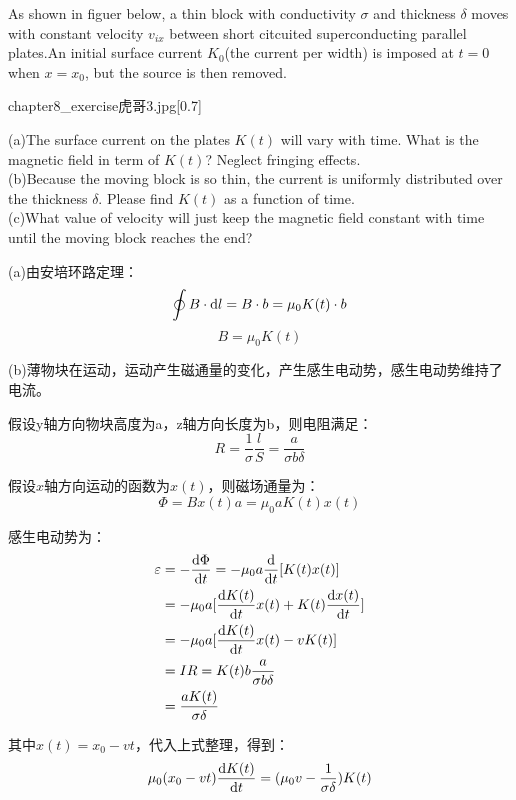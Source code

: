 \begin{solution}
    As shown in figuer below, a thin block with conductivity \(\sigma\) and thickness \( \delta \) moves with constant velocity $v_{ix}$
    between short citcuited superconducting parallel plates.An initial surface current \( K_0 \)(the current per width) is imposed
    at \( t = 0 \) when \( x = x_0 \), but the source is then removed.
    \begin{singlefigure}{chapter8_exercise虎哥3.jpg}[0.7]
    \end{singlefigure}

    (a)The surface current on the plates \( K(t) \) will vary with time. What is the magnetic field in term of \( K(t) \)? Neglect 
    fringing effects.\\
    (b)Because the moving block is so thin, the current is uniformly distributed over the thickness \( \delta \).
    Please find \( K(t) \) as a function of time.\\
    (c)What value of velocity will just keep the magnetic field constant with time until the moving block reaches the end?
    \tcbrule

    (a)由安培环路定理：
    \[\oint B\cdot\dif l = B\cdot b = \mu_0 K(t)\cdot b\]
    \[B = \mu_0 K(t)\]

    (b)薄物块在运动，运动产生磁通量的变化，产生感生电动势，感生电动势维持了电流。

    假设y轴方向物块高度为a，z轴方向长度为b，则电阻满足：
    \[R = \dfrac{1}{\sigma}\dfrac{l}{S} = \dfrac{a}{\sigma b\delta}\]

    假设$x$轴方向运动的函数为$x(t)$，则磁场通量为：
    \[\Phi = Bx(t)a = \mu_0 a K(t)x(t)\]

    感生电动势为：
    \begin{align*}
        \varepsilon &= -\dfrac{\dif \Phi}{\dif t} = -\mu_0 a \dfrac{\dif}{\dif t}[K(t)x(t)]\\
                    &= -\mu_0 a [\dfrac{\dif K(t)}{\dif t}x(t) + K(t)\dfrac{\dif x(t)}{\dif t}]\\
                    &= -\mu_0 a [\dfrac{\dif K(t)}{\dif t}x(t) - v K(t)]\\
                    &= IR = K(t) b \dfrac{a}{\sigma b\delta}\\
                    &= \dfrac{aK(t)}{\sigma \delta}
    \end{align*}

    其中$x(t) = x_0 - vt$，代入上式整理，得到：
    \[\mu_0(x_0 - vt) \dfrac{\dif K(t)}{\dif t} = (\mu_0 v - \dfrac{1}{\sigma \delta})K(t)\]


\end{solution}
